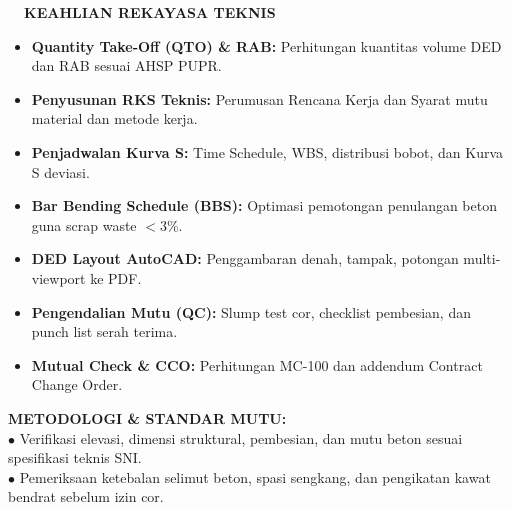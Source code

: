 \documentclass[10pt,a4paper,landscape]{article}
\begin{document}
\noindent
\begin{minipage}[t]{0.32\linewidth}
  \vspace{0pt}
  \begin{tcolorbox}[sharp corners, boxrule=0.8pt, colframe=pborder, colback=white, left=3mm, right=3mm, top=2.5mm, bottom=2.5mm, height=100mm]
    \colorbox{pred}{\fontsize{7pt}{8pt}\selectfont\bfseries\color{white}\ \ KEAHLIAN REKAYASA TEKNIS\ \ }\\[1.5mm]

    {\fontsize{6.7pt}{8.4pt}\selectfont\color{psteel}
    \begin{itemize}[leftmargin=3mm, itemsep=0.6mm, topsep=0mm]
      \item \textbf{Quantity Take-Off (QTO) \& RAB:} Perhitungan kuantitas volume DED dan RAB sesuai AHSP PUPR.
      \item \textbf{Penyusunan RKS Teknis:} Perumusan Rencana Kerja dan Syarat mutu material dan metode kerja.
      \item \textbf{Penjadwalan Kurva S:} Time Schedule, WBS, distribusi bobot, dan Kurva S deviasi.
      \item \textbf{Bar Bending Schedule (BBS):} Optimasi pemotongan penulangan beton guna scrap waste $< 3\%$.
      \item \textbf{DED Layout AutoCAD:} Penggambaran denah, tampak, potongan multi-viewport ke PDF.
      \item \textbf{Pengendalian Mutu (QC):} Slump test cor, checklist pembesian, dan punch list serah terima.
      \item \textbf{Mutual Check \& CCO:} Perhitungan MC-100 dan addendum Contract Change Order.
    \end{itemize}
    }
  \end{tcolorbox}
  \vspace{2mm}

  \begin{tcolorbox}[sharp corners, boxrule=0.6pt, colframe=pnavy, colback=pbglight, left=2.5mm, right=2.5mm, top=2mm, bottom=2mm, height=52mm]
    {\fontsize{7pt}{8.5pt}\selectfont\bfseries\color{pnavy}METODOLOGI \& STANDAR MUTU:}\\[1.5mm]
    {\fontsize{6.5pt}{8.2pt}\selectfont\color{psteel}
    $\bullet$ Verifikasi elevasi, dimensi struktural, pembesian, dan mutu beton sesuai spesifikasi teknis SNI.\\
    $\bullet$ Pemeriksaan ketebalan selimut beton, spasi sengkang, dan pengikatan kawat bendrat sebelum izin cor.
    }
  \end{tcolorbox}
\end{minipage}%
\end{document}
